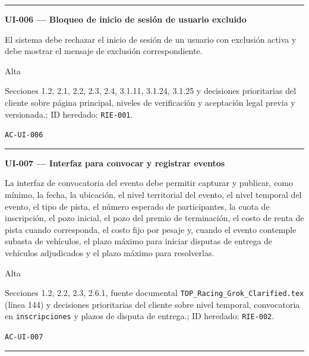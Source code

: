 \documentclass[10pt,letterpaper]{article}
\begin{document}
\vspace{0.25em}\hrule\vspace{0.65em}
\noindent\textbf{UI-006 --- Bloqueo de inicio de sesión de usuario excluido}\par
\begin{description}[style=nextline,leftmargin=3.15cm,labelwidth=2.8cm,font=\normalfont\bfseries]
\item[Obligación] El sistema debe rechazar el inicio de sesión de un usuario con exclusión activa y debe mostrar el mensaje de exclusión correspondiente.
\item[Prioridad] Alta
\item[Procedencia] Secciones 1.2, 2.1, 2.2, 2.3, 2.4, 3.1.11, 3.1.24, 3.1.25 y decisiones prioritarias del cliente sobre página principal, niveles de verificación y aceptación legal previa y versionada.; ID heredado: \texttt{RIE-001}.
\item[Verificación] \texttt{AC-UI-006}
\end{description}
\vspace{0.25em}\hrule\vspace{0.65em}
\noindent\textbf{UI-007 --- Interfaz para convocar y registrar eventos}\par
\begin{description}[style=nextline,leftmargin=3.15cm,labelwidth=2.8cm,font=\normalfont\bfseries]
\item[Obligación] La interfaz de convocatoria del evento debe permitir capturar y publicar, como mínimo, la fecha, la ubicación, el nivel territorial del evento, el nivel temporal del evento, el tipo de pista, el número esperado de participantes, la cuota de inscripción, el pozo inicial, el pozo del premio de terminación, el costo de renta de pista cuando corresponda, el costo fijo por pesaje y, cuando el evento contemple subasta de vehículos, el plazo máximo para iniciar disputas de entrega de vehículos adjudicados y el plazo máximo para resolverlas.
\item[Prioridad] Alta
\item[Procedencia] Secciones 1.2, 2.2, 2.3, 2.6.1, fuente documental \texttt{TOP\_Racing\_Grok\_Clarified.tex} (línea 144) y decisiones prioritarias del cliente sobre nivel temporal, convocatoria en \texttt{inscripciones} y plazos de disputa de entrega.; ID heredado: \texttt{RIE-002}.
\item[Verificación] \texttt{AC-UI-007}
\end{description}
\vspace{0.25em}\hrule\vspace{0.65em}
\end{document}

